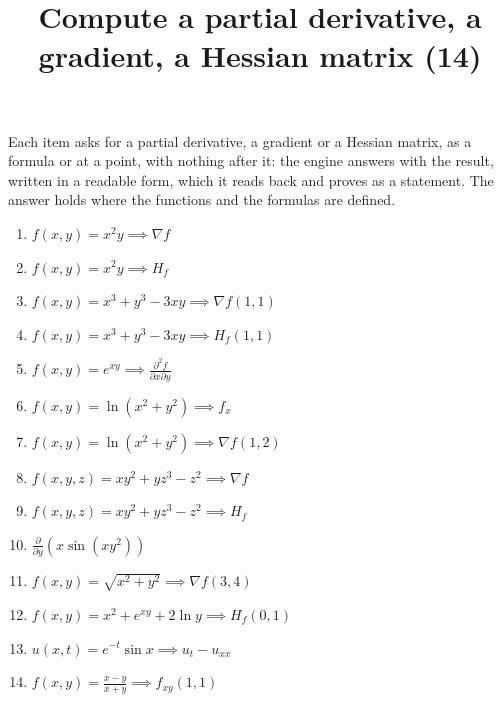 \documentclass[11pt,a4paper]{article}
\title{Compute a partial derivative, a gradient, a Hessian matrix (14)}
\author{}
\date{}
\begin{document}
\maketitle
Each item asks for a partial derivative, a gradient or a Hessian matrix, as a formula or at a point, with nothing after it: the engine answers with the result, written in a readable form, which it reads back and proves as a statement. The answer holds where the functions and the formulas are defined.

\begin{enumerate}
\item $\displaystyle f(x, y) = x^{2} y \implies \nabla f$
\item $\displaystyle f(x, y) = x^{2} y \implies H_{f}$
\item $\displaystyle f(x, y) = x^{3} + y^{3} - 3xy \implies \nabla f(1, 1)$
\item $\displaystyle f(x, y) = x^{3} + y^{3} - 3xy \implies H_{f}(1, 1)$
\item $\displaystyle f(x, y) = e^{xy} \implies \frac{\partial^{2} f}{\partial x \partial y}$
\item $\displaystyle f(x, y) = \ln(x^{2} + y^{2}) \implies f_{x}$
\item $\displaystyle f(x, y) = \ln(x^{2} + y^{2}) \implies \nabla f(1, 2)$
\item $\displaystyle f(x, y, z) = xy^{2} + yz^{3} - z^{2} \implies \nabla f$
\item $\displaystyle f(x, y, z) = xy^{2} + yz^{3} - z^{2} \implies H_{f}$
\item $\displaystyle \frac{\partial}{\partial y}\left( x \sin(xy^{2}) \right)$
\item $\displaystyle f(x, y) = \sqrt{x^{2} + y^{2}} \implies \nabla f(3, 4)$
\item $\displaystyle f(x, y) = x^{2} + e^{xy} + 2\ln y \implies H_{f}(0, 1)$
\item $\displaystyle u(x, t) = e^{-t} \sin x \implies u_{t} - u_{xx}$
\item $\displaystyle f(x, y) = \frac{x - y}{x + y} \implies f_{xy}(1, 1)$
\end{enumerate}
\end{document}
